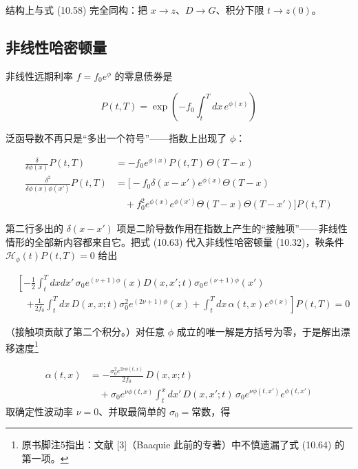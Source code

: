 结构上与式 (10.58) 完全同构：把 $x\to z$、$D\to G$、积分下限 $t\to z(0)$。

\subsection{非线性哈密顿量}

非线性远期利率 $f=f_0e^\phi$ 的零息债券是

\begin{equation*}
P(t,T)=\exp\left(-f_0\int_t^T dx\,e^{\phi(x)}\right)
\tag{10.62}
\end{equation*}

泛函导数不再只是“多出一个符号”——指数上出现了 $\phi$：

\begin{equation*}
\begin{aligned}
\frac{\delta}{\delta\phi(x)}P(t,T)&=-f_0e^{\phi(x)}P(t,T)\,\Theta(T-x)\\
\frac{\delta^2}{\delta\phi(x)\phi(x')}P(t,T)&=\Big[-f_0\delta(x-x')e^{\phi(x)}\Theta(T-x)\\
&\quad+f_0^2e^{\phi(x)}e^{\phi(x')}\Theta(T-x)\Theta(T-x')\Big]P(t,T)
\end{aligned}
\tag{10.63}
\end{equation*}

第二行多出的 $\delta(x-x')$ 项是二阶导数作用在指数上产生的“接触项”——非线性情形的全部新内容都来自它。把式 (10.63) 代入非线性哈密顿量 (10.32)，鞅条件 $\mathcal{H}_\phi(t)P(t,T)=0$ 给出

\begin{equation*}
\begin{aligned}
&\left[-\frac{1}{2}\int_t^T dxdx'\,\sigma_0e^{(\nu+1)\phi}(x)D(x,x';t)\sigma_0e^{(\nu+1)\phi}(x')\right.\\
&\quad\left.+\frac{1}{2f_0}\int_t^T dx\,D(x,x;t)\sigma_0^2e^{(2\nu+1)\phi}(x)+\int_t^T dx\,\alpha(t,x)e^{\phi(x)}\right]P(t,T)=0
\end{aligned}
\end{equation*}

（接触项贡献了第二个积分。）对任意 $\phi$ 成立的唯一解是方括号为零，于是解出漂移速度\footnote{原书脚注5指出：文献 [3]（Baaquie 此前的专著）中不慎遗漏了式 (10.64) 的第一项。}

\begin{equation*}
\begin{aligned}
\alpha(t,x)&=-\frac{\sigma_0^2e^{2\nu\phi(t,x)}}{2f_0}\,D(x,x;t)\\
&\quad+\sigma_0e^{\nu\phi(t,x)}\int_t^x dx'\,D(x,x';t)\,\sigma_0e^{\nu\phi(t,x')}e^{\phi(t,x')}
\end{aligned}
\tag{10.64}
\end{equation*}取确定性波动率 $\nu=0$、并取最简单的 $\sigma_0=\text{常数}$，得

